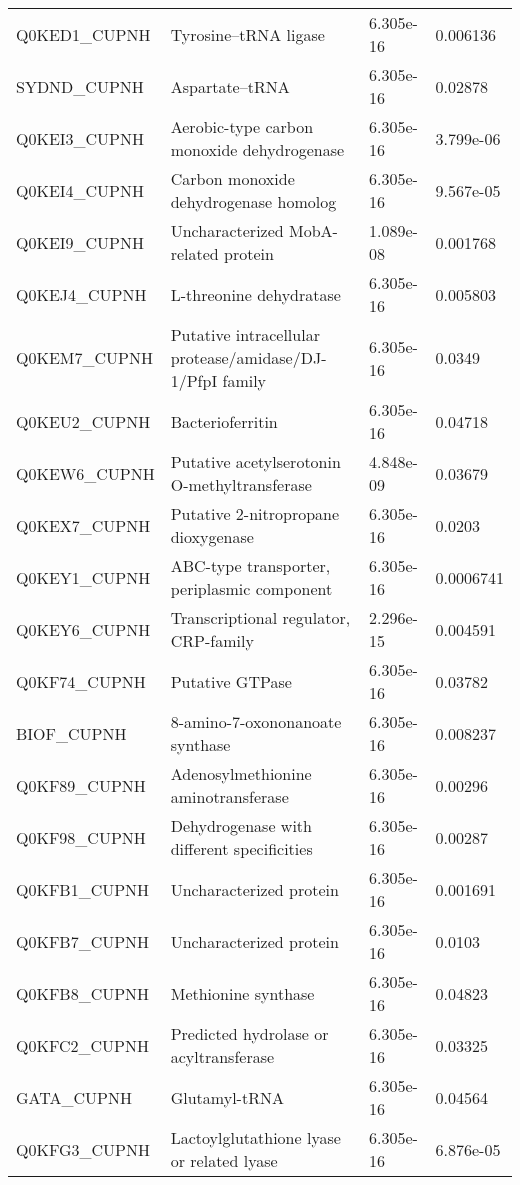 \begin{center}
\begin{longtable}{ l l l l }
Q0KED1\_CUPNH & Tyrosine--tRNA ligase& 6.305e-16 & 0.006136 \\ [0.5ex]
SYDND\_CUPNH & Aspartate--tRNA & 6.305e-16 & 0.02878 \\ [0.5ex]
Q0KEI3\_CUPNH & Aerobic-type carbon monoxide dehydrogenase & 6.305e-16 & 3.799e-06 \\ [0.5ex]
Q0KEI4\_CUPNH & Carbon monoxide dehydrogenase homolog & 6.305e-16 & 9.567e-05 \\ [0.5ex]
Q0KEI9\_CUPNH & Uncharacterized MobA-related protein& 1.089e-08 & 0.001768 \\ [0.5ex]
Q0KEJ4\_CUPNH & L-threonine dehydratase& 6.305e-16 & 0.005803 \\ [0.5ex]
Q0KEM7\_CUPNH & Putative intracellular protease/amidase/DJ-1/PfpI family& 6.305e-16 & 0.0349 \\ [0.5ex]
Q0KEU2\_CUPNH & Bacterioferritin& 6.305e-16 & 0.04718 \\ [0.5ex]
Q0KEW6\_CUPNH & Putative acetylserotonin O-methyltransferase& 4.848e-09 & 0.03679 \\ [0.5ex]
Q0KEX7\_CUPNH & Putative 2-nitropropane dioxygenase& 6.305e-16 & 0.0203 \\ [0.5ex]
Q0KEY1\_CUPNH & ABC-type transporter, periplasmic component& 6.305e-16 & 0.0006741 \\ [0.5ex]
Q0KEY6\_CUPNH & Transcriptional regulator, CRP-family& 2.296e-15 & 0.004591 \\ [0.5ex]
Q0KF74\_CUPNH & Putative GTPase& 6.305e-16 & 0.03782 \\ [0.5ex]
BIOF\_CUPNH & 8-amino-7-oxononanoate synthase& 6.305e-16 & 0.008237 \\ [0.5ex]
Q0KF89\_CUPNH & Adenosylmethionine aminotransferase& 6.305e-16 & 0.00296 \\ [0.5ex]
Q0KF98\_CUPNH & Dehydrogenase with different specificities& 6.305e-16 & 0.00287 \\ [0.5ex]
Q0KFB1\_CUPNH & Uncharacterized protein& 6.305e-16 & 0.001691 \\ [0.5ex]
Q0KFB7\_CUPNH & Uncharacterized protein& 6.305e-16 & 0.0103 \\ [0.5ex]
Q0KFB8\_CUPNH & Methionine synthase& 6.305e-16 & 0.04823 \\ [0.5ex]
Q0KFC2\_CUPNH & Predicted hydrolase or acyltransferase& 6.305e-16 & 0.03325 \\ [0.5ex]
GATA\_CUPNH & Glutamyl-tRNA & 6.305e-16 & 0.04564 \\ [0.5ex]
Q0KFG3\_CUPNH & Lactoylglutathione lyase or related lyase& 6.305e-16 & 6.876e-05 \\ [0.5ex]

\end{longtable}
\end{center}
